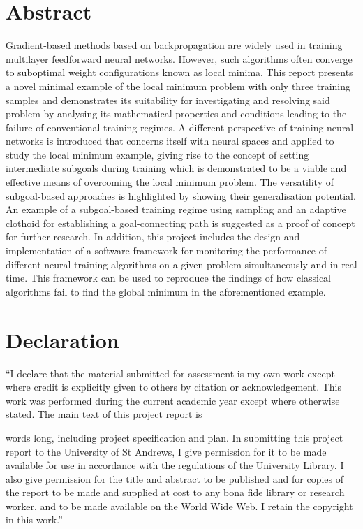 \documentclass[a4paper,oneside]{book}
\newcommand{\quickwordcount}[1]{%
  \immediate\write18{texcount -1 -sum -merge #1.tex > #1-words}%
  words%
}
\theoremstyle{definition}
\begin{document}
\chapter*{Abstract}
Gradient-based methods based on backpropagation are widely used in training multilayer feedforward neural networks. 
However, such algorithms often converge to suboptimal weight configurations known as local minima. 
This report presents a novel minimal example of the local minimum problem with only three training samples and demonstrates its suitability for investigating and resolving said problem by analysing its mathematical properties and conditions leading to the failure of conventional training regimes. 
A different perspective of training neural networks is introduced that concerns itself with neural spaces and applied to study the local minimum example, giving rise to the concept of setting intermediate subgoals during training which is demonstrated to be a viable and effective means of overcoming the local minimum problem. 
The versatility of subgoal-based approaches is highlighted by showing their generalisation potential. 
An example of a subgoal-based training regime using sampling and an adaptive clothoid for establishing a goal-connecting path is suggested as a proof of concept for further research. 
In addition, this project includes the design and implementation of a software framework for monitoring the performance of different neural training algorithms on a given problem simultaneously and in real time. 
This framework can be used to reproduce the findings of how classical algorithms fail to find the global minimum in the aforementioned example.


\chapter*{Declaration}
``I declare that the material submitted for assessment is my own work except where credit is explicitly given to others by citation or acknowledgement.
This work was performed during the current academic year except where otherwise stated.
The main text of this project report is \quickwordcount{report} long, including project specification and plan.
In submitting this project report to the University of St Andrews, I give permission for it to be made available for use in accordance with the regulations of the University Library. 
I also give permission for the title and abstract to be published and for copies of the report to be made and supplied at cost to any bona fide library or research worker, and to be made available on the World Wide Web.
I retain the copyright in this work.''
\end{document}
